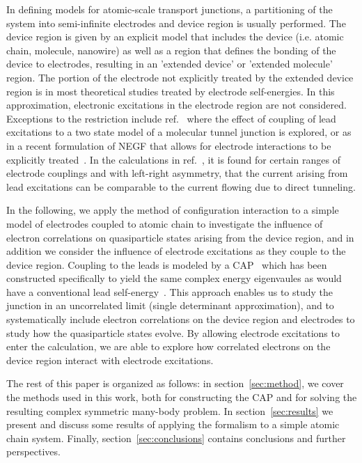 In defining models for atomic-scale transport junctions, a partitioning
of the system into semi-infinite electrodes and device region is usually
performed. The device region is given by an explicit model that includes
the device (i.e. atomic chain, molecule, nanowire) as well as a region
that defines the bonding of the device to electrodes, resulting in an
'extended device' or 'extended molecule' region. The portion of the
electrode not explicitly treated by the extended device region is in
most theoretical studies treated by electrode self-energies. In this
approximation, electronic excitations in the electrode region are not
considered. Exceptions to the restriction include
ref.~\cite{galperin_nitzan2006leadexcitations} where the effect of coupling
of lead excitations to a two state model of a molecular tunnel junction is
explored, or as in a recent formulation of \ac{NEGF} that allows for
electrode interactions to be explicitly treated~\cite{ness2012jpa_leadnegf}.
In the calculations in ref.~\cite{galperin_nitzan2006leadexcitations}, it is
found for certain ranges of electrode couplings and with left-right asymmetry,
that the current arising from lead excitations can be comparable to the
current flowing due to direct tunneling.

In the following, we apply the method of configuration interaction to a
simple model of electrodes coupled to atomic chain to investigate the
influence of electron correlations on quasiparticle states arising from
the device region, and in addition we consider the influence of electrode
excitations as they couple to the device region. Coupling to the leads is
modeled by a \ac{CAP}~\cite{muga} which has been constructed specifically to
yield the same complex energy eigenvaules as would have a conventional lead
self-energy~\cite{henderson}. This approach enables us to study the junction
in an uncorrelated limit (single determinant approximation), and to
systematically include electron correlations on the device region and
electrodes to study how the quasiparticle states evolve. By allowing electrode
excitations to enter the calculation, we are able to explore how correlated
electrons on the device region interact with electrode excitations.

The rest of this paper is organized as follows: in
section~\ref{sec:method}, we cover the methods used in this work, both for
constructing the \ac{CAP} and for solving the resulting complex symmetric
many-body problem. In section~\ref{sec:results} we present and discuss some
results of applying the formalism to a simple atomic chain system. Finally,
section~\ref{sec:conclusions} contains conclusions and further perspectives.

